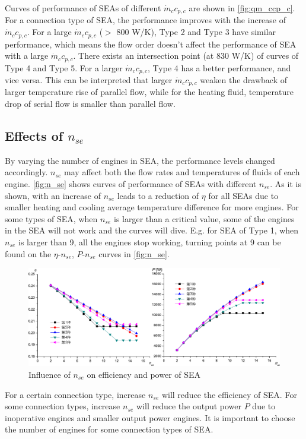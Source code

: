 Curves of performance of SEAs of different $\dot{m}_cc_{p,c}$ are shown in \autoref{fig:qm_ccp_c}. For a connection type of SEA, the performance improves with the increase of $\dot{m}_cc_{p,c}$. For a large $\dot{m}_cc_{p,c}$ ($>$ 800 W/K), Type 2 and Type 3 have similar performance, which means the flow order doesn't affect the performance of SEA with a large $\dot{m}_cc_{p,c}$. There exists an intersection point (at 830 W/K) of curves of Type 4 and Type 5. For a larger $\dot{m}_cc_{p,c}$, Type 4 has a better performance, and vice versa. This can be interpreted that larger $\dot{m}_cc_{p,c}$ weaken the drawback of larger temperature rise of parallel flow, while for the heating fluid, temperature drop of serial flow is smaller than parallel flow.

\subsection{Effects of $n_{se}$}

By varying the number of engines in SEA, the performance levels changed accordingly. $n_{se}$ may affect both the flow rates and temperatures of fluids of each engine. \autoref{fig:n_se} shows curves of performance of SEAs with different $n_{se}$. As it is shown, with an increase of $n_{se}$ leads to a reduction of $\eta$ for all SEAs due to smaller heating and cooling average temperature difference for more engines. For some types of SEA, when $n_{se}$ is larger than a critical value, some of the engines in the SEA will not work and the curves will dive. E.g. for SEA of Type 1, when $n_{se}$ is larger than 9, all the engines stop working, turning points at 9 can be found on the $\eta$-$n_{se}$, $P$-$n_{se}$ curves in \autoref{fig:n_se}.

\begin{figure}[htbp]
\centering
	\includegraphics[width = 0.7\columnwidth]{fig/n_se}
	\caption{Influence of $n_{se}$ on efficiency and power of SEA}
	\label{fig:n_se}
\end{figure}

For a certain connection type, increase $n_{se}$ will reduce the efficiency of SEA. For some connection types, increase $n_{se}$ will reduce the output power $P$ due to inoperative engines and smaller output power engines. It is important to choose the number of engines for some connection types of SEA. 

